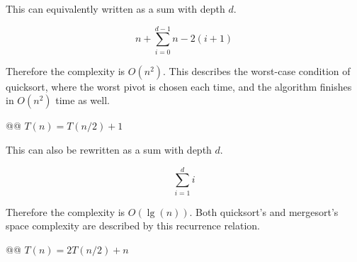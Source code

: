 \documentclass[10pt]{article}
\begin{document}
\begin{easylist}[enumerate]
        This can equivalently written as a sum with depth $d$.

            \[ n + \sum^{d-1}_{i=0} n - 2(i + 1) \]

        Therefore the complexity is $O(n^2)$. This describes the worst-case condition of quicksort, where the worst pivot is chosen each time, and the algorithm finishes in $O(n^2)$ time as well.

    @@ $T(n) = T(n/2) + 1$

        \begin{figure}[!ht]
            \centering
        \end{figure}

        This can also be rewritten as a sum with depth $d$.

        \[ \sum^d_{i=1} i \]

        Therefore the complexity is $O(\lg(n))$. Both quicksort's and mergesort's space complexity are described by this recurrence relation.

    @@ $T(n) = 2T(n/2) + n$


\end{easylist}
\end{document}

